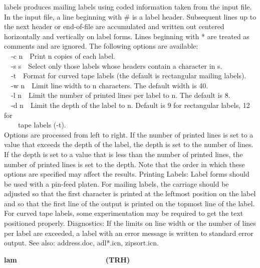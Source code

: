 {\textsf{labels} produces mailing labels using coded information taken
from the input file. In the input file, a line beginning with \# is a
label header. Subsequent lines up to the next header or end-of-file are
accumulated and written out centered horizontally and vertically on
label forms. Lines beginning with * are treated as comments and are
ignored. The following options are available:\\
\ \ \textsf{{}-c n}\ \ Print n copies of each label.\\
\ \ \textsf{{}-s s}\ \ Select only those labels whose headers contain a
character in s.\\
\ \ \textsf{{}-t}\ \ Format for curved tape labels (the default is
rectangular mailing labels).\\
\ \ \textsf{{}-w n}\ \ Limit line width to n characters. The default
width is 40.\\
\ \ \textsf{{}-l n}\ \ Limit the number of printed lines per label to n.
The default is 8.\\
\ \ \textsf{{}-d n}\ \ Limit the depth of the label to n. Default is 9
for rectangular labels, 12 for\\
\ \ \ \ tape labels (\textsf{{}-t}).\\
Options are processed from left to right. If the number of printed lines
is set to a value that exceeds the depth of the label, the depth is set
to the number of lines. If the depth is set to a value that is less
than the number of printed lines, the number of printed lines is set to
the depth. Note that the order in which these options are specified may
affect the results. Printing Labels: Label forms should be used with a
pin-feed platen. For mailing labels, the carriage should be adjusted so
that the first character is printed at the leftmost position on the
label and so that the first line of the output is printed on the
topmost line of the label. For curved tape labels, some experimentation
may be required to get the text positioned properly. Diagnostics: If
the limits on line width or the number of lines per label are exceeded,
a label with an error message is written to standard error output. See
also: address.doc, adl*.icn, zipsort.icn. 

{\sffamily\bfseries
lam\ \ \ \ \ \ \ \ \ \ \ \ \ \ \ \ \ \ \ \ \ \ (TRH)}

}
